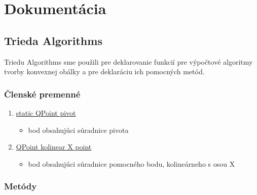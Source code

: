 \documentclass[12pt]{article}
\begin{document}

\section{Dokumentácia}
\subsection{Trieda Algorithms}
Triedu Algorithms sme použili pre deklarovanie funkcií pre výpočtové algoritmy tvorby konvexnej obálky a pre deklaráciu ich pomocných metód.

\subsubsection{Členské premenné}

\begin{enumerate}
\item[] \underline{static QPoint pivot} 
\begin{itemize}
\item bod obsahujúci súradnice pivota
\end{itemize}
\item[] \underline{QPoint kolinear X point} 
\begin{itemize}
\item bod obsahujúci súradnice pomocného bodu, kolineárneho s osou X
\end{itemize}
\end{enumerate}

\subsubsection{Metódy}
\end{document}
